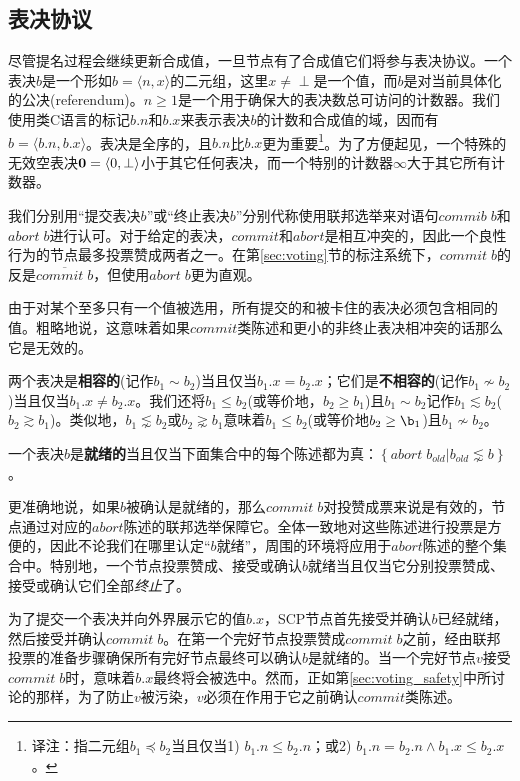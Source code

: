 \subsection{表决协议}
尽管提名过程会继续更新合成值，一旦节点有了合成值它们将参与表决协议。一个表决$b$是一个形如$b=\langle n,x\rangle$的二元组，这里$x\neq \perp$是一个值，而$b$是对当前{\slot}具体化的公决(referendum)。$n\geq 1$是一个用于确保大的表决数总可访问的计数器。我们使用类C语言的标记$b.n$和$b.x$来表示表决$b$的计数和合成值的域，因而有$b=\langle b.n, b.x\rangle$。表决是全序的，且$b.n$比$b.x$更为重要{\footnote{译注：指二元组$b_1\preceq b_2$当且仅当1) $b_1.n \leq b_2.n$；或2) $b_1.n=b_2.n \wedge b_1.x \leq b_2.x$。}}。为了方便起见，一个特殊的无效空表决${\bm 0}=\langle 0,\perp\rangle$小于其它任何表决，而一个特别的计数器$\infty$大于其它所有计数器。

我们分别用``提交表决$b$''或``终止表决$b$''分别代称使用联邦选举来对语句$commib\;b$和$abort\;b$进行认可。对于给定的表决，$commit$和$abort$是相互冲突的，因此一个良性行为的节点最多投票赞成两者之一。在第\ref{sec:voting}节的标注系统下，$commit\;b$的反是$\overline{commit\;b}$，但使用$abort\;b$更为直观。

由于对某个{\slot}至多只有一个值被选用，所有提交的和被卡住的表决必须包含相同的值。粗略地说，这意味着如果$commit$类陈述和更小的非终止表决相冲突的话那么它是无效的。

\begin{definition}[相容的]
        两个表决是\textbf{相容的}(记作$b_1 \sim b_2$)当且仅当$b_1.x=b_2.x$；它们是\textbf{不相容的}(记作$b_1\not\sim b_2$)当且仅当$b_1.x\neq b_2.x$。我们还将$b_1\leq b_2$(或等价地，$b_2\geq b_1$)且$b_1\sim b_2$记作$b_1\lesssim b_2$($b_2\gtrsim b_1$)。类似地，$b_1\lnsim b_2$或$b_2\gnsim b_1$意味着$b_1\leq b_2$(或等价地$b_2\geq \b_1$)且$b_1\not\sim b_2$。
\end{definition}

\begin{definition}[就绪的]
        一个表决$b$是\textbf{就绪的}当且仅当下面集合中的每个陈述都为真：$\left\{abort\;b_{old}|b_{old}\lnsim b\right\}$。
\end{definition}

更准确地说，如果$b$被确认是就绪的，那么$commit\;b$对投赞成票来说是有效的，节点通过对应的$abort$陈述的联邦选举保障它。全体一致地对这些陈述进行投票是方便的，因此不论我们在哪里认定{}``$b$就绪''，周围的环境将应用于$abort$陈述的整个集合中。特别地，一个节点投票赞成、接受或确认$b$就绪当且仅当它分别投票赞成、接受或确认它们全部\textit{终止}了。

为了提交一个表决并向外界展示它的值$b.x$，SCP节点首先接受并确认$b$已经就绪，然后接受并确认$commit\;b$。在第一个完好节点投票赞成$commit\;b$之前，经由联邦投票的准备步骤确保所有完好节点最终可以确认$b$是就绪的。当一个完好节点$v$接受$commit\;b$时，意味着$b.x$最终将会被选中。然而，正如第\ref{sec:voting_safety}中所讨论的那样，为了防止$v$被污染，$v$必须在作用于它之前确认$commit$类陈述。


